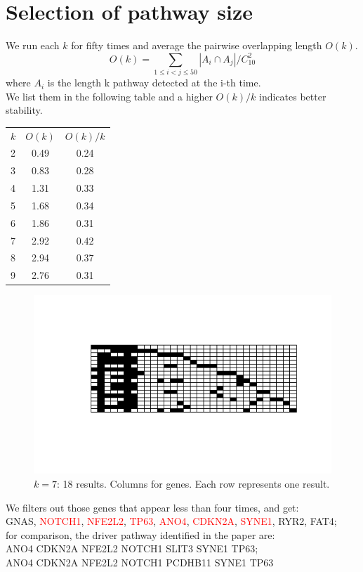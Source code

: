 \documentclass[xcolor=dvipsnames]{beamer}
\begin{document}
\section{Selection of pathway size}
\begin{frame}
We run each $k$ for fifty times and average the pairwise overlapping length $O(k)$.\\
\[
O(k)=\sum_{1\leqslant i<j\leqslant 50}|A_i\cap A_j|/C_{10}^2
\]
where $A_i$ is the length k pathway detected at the i-th time.\\
We list them in the following table and a higher $O(k)/k$ indicates better stability.\\
\begin{table}
\begin{tabular}{lcc}
$k$&$O(k)$&$O(k)/k$\\
2&0.49&0.24\\
3&0.83& 0.28\\
4&1.31&0.33\\
5&1.68&0.34\\
6&1.86&0.31\\
7&2.92&0.42\\
8&2.94&0.37\\
9&2.76&0.31\\
\end{tabular}
\end{table}
\end{frame}
\begin{frame}
\begin{figure}
\centering
\includegraphics[width=0.6\linewidth]{k7case.png}
\caption{$k=7$: 18 results. Columns for genes. Each row represents one result.}
\end{figure}
We filters out those genes that appear less than four times, and get:\\
GNAS, \textcolor{red}{NOTCH1}, \textcolor{red}{NFE2L2}, \textcolor{red}{TP63}, \textcolor{red}{ANO4}, \textcolor{red}{CDKN2A}, \textcolor{red}{SYNE1}, RYR2, FAT4;\\
for comparison, the driver pathway identified in the paper are:\\
ANO4 CDKN2A NFE2L2 NOTCH1 SLIT3 SYNE1 TP63;\\
ANO4 CDKN2A NFE2L2 NOTCH1 PCDHB11 SYNE1 TP63
\end{frame}
\end{document}

